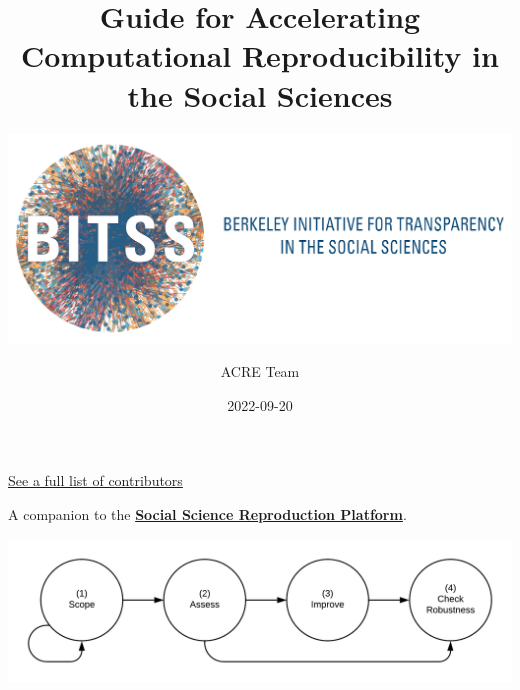 \documentclass[
  openany]{book}
\title{Guide for Accelerating Computational Reproducibility in the Social Sciences}
\subtitle{\href{https://www.bitss.org/}{\includegraphics{BITSS_logo_horizontal.png}}}
\author{ACRE Team}
\date{2022-09-20}
\begin{document}
\maketitle

{
\setcounter{tocdepth}{1}
\tableofcontents
}
\hypertarget{section}{%
\chapter*{}\label{section}}

\protect\hyperlink{contributions}{See a full list of contributors}

A companion to the \href{https://www.socialsciencereproduction.org/}{\textbf{Social Science Reproduction Platform}}.

\includegraphics[width=1\linewidth]{stages}
\end{document}
